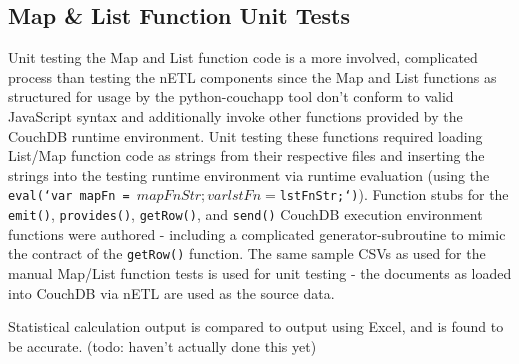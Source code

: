 \newpage



\subsection{Map \& List Function Unit Tests}
Unit testing the Map and List function code is a more involved, complicated process than testing the nETL components since the Map and List functions as structured for usage by the python-couchapp tool don't conform to valid JavaScript syntax and additionally invoke other functions provided by the CouchDB runtime environment. Unit testing these functions required loading List/Map function code as strings from their respective files and inserting the strings into the testing runtime environment via runtime evaluation (using the \texttt{eval(`var mapFn = ${mapFnStr}; var lstFn = ${lstFnStr};`)}). Function stubs for the \texttt{emit()}, \texttt{provides()}, \texttt{getRow()}, and \texttt{send()} CouchDB execution environment functions were authored - including a complicated generator-subroutine to mimic the contract of the \texttt{getRow()} function. The same sample CSVs as used for the manual Map/List function tests is used for unit testing - the documents as loaded into CouchDB via nETL are used as the source data.

Statistical calculation output is compared to output using Excel, and is found to be accurate. (todo: haven't actually done this yet)